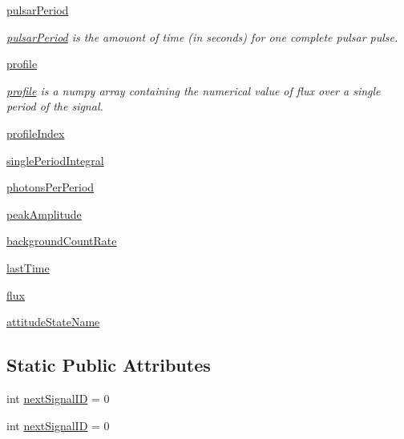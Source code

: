 \begin{DoxyCompactItemize}
\hyperlink{classmodest_1_1signals_1_1xraysource_1_1PeriodicXRaySource_aeb6d4a8057d3ee58c81e69fb97b9eef7}{pulsar\+Period}
\begin{DoxyCompactList}\small\item\em \hyperlink{classmodest_1_1signals_1_1xraysource_1_1PeriodicXRaySource_aeb6d4a8057d3ee58c81e69fb97b9eef7}{pulsar\+Period} is the amouont of time (in seconds) for one complete pulsar pulse. \end{DoxyCompactList}\item 
\hyperlink{classmodest_1_1signals_1_1xraysource_1_1PeriodicXRaySource_a50e061bb97d0dd6ab7f344370c6b35a4}{profile}
\begin{DoxyCompactList}\small\item\em \hyperlink{classmodest_1_1signals_1_1xraysource_1_1PeriodicXRaySource_a50e061bb97d0dd6ab7f344370c6b35a4}{profile} is a numpy array containing the numerical value of flux over a single period of the signal. \end{DoxyCompactList}\item 
\hyperlink{classmodest_1_1signals_1_1xraysource_1_1PeriodicXRaySource_aaf45141c09e1fd35c80c49907fa44497}{profile\+Index}
\item 
\hyperlink{classmodest_1_1signals_1_1xraysource_1_1PeriodicXRaySource_ab193c1d52a5bd8b0798bf407abcca72d}{single\+Period\+Integral}
\item 
\hyperlink{classmodest_1_1signals_1_1xraysource_1_1PeriodicXRaySource_a25ab09a55afd1da4f019ad580770e5f4}{photons\+Per\+Period}
\item 
\hyperlink{classmodest_1_1signals_1_1xraysource_1_1PeriodicXRaySource_ab9ca2f0588f7e2f23c5301e05070fe99}{peak\+Amplitude}
\item 
\hyperlink{classmodest_1_1signals_1_1xraysource_1_1PeriodicXRaySource_a3a04d3f0609b7454efc4ef9cdcd7b219}{background\+Count\+Rate}
\item 
\hyperlink{classmodest_1_1signals_1_1poissonsource_1_1PoissonSource_a34395fc83bd8743a0a5ee69f9392a606}{last\+Time}
\item 
\hyperlink{classmodest_1_1signals_1_1poissonsource_1_1PoissonSource_a6f2c657ad936b921715d826ac74f7fe5}{flux}
\item 
\hyperlink{classmodest_1_1signals_1_1pointsource_1_1PointSource_a0924a2233bb4fd23e50d024e4f1b048e}{attitude\+State\+Name}
\end{DoxyCompactItemize}
\subsection*{Static Public Attributes}
\begin{DoxyCompactItemize}
\item 
int \hyperlink{classmodest_1_1signals_1_1signalsource_1_1SignalSource_a453eafb550b551adbec0903deb63dfce}{next\+Signal\+ID} = 0
\item 
int \hyperlink{classmodest_1_1signals_1_1signalsource_1_1SignalSource_a453eafb550b551adbec0903deb63dfce}{next\+Signal\+ID} = 0
\end{DoxyCompactItemize}



